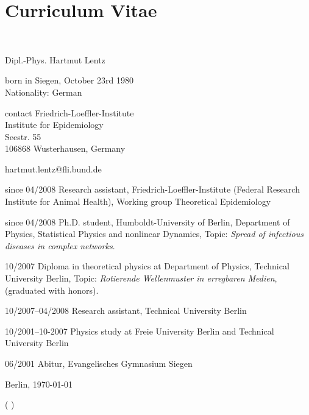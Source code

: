 \chapter*{Curriculum Vitae}

\begin{cv}{~}
  
\begin{cvlist}{\color{Steel}{Personal information}}
  \item Dipl.-Phys. Hartmut Lentz
    \item born in Siegen, October 23rd 1980\\
	Nationality: German
    \item[contact] Friedrich-Loeffler-Institute\\
    Institute for Epidemiology\\
    Seestr. 55\\
    106868 Wusterhausen, Germany
   \item hartmut.lentz@fli.bund.de	

\end{cvlist}

  \begin{cvlist}{\color{Steel}{Education and job history}}
  \item[since 04/2008] Research assistant, Friedrich-Loeffler-Institute (Federal Research Institute for Animal Health), Working group Theoretical Epidemiology
   \item[since 04/2008] Ph.D. student, Humboldt-University of Berlin, Department of
Physics, Statistical Physics and nonlinear Dynamics, Topic: \emph{Spread of infectious diseases in complex networks}.
  \item[10/2007] Diploma in theoretical physics at Department of Physics, Technical University Berlin, Topic: \emph{Rotierende Wellenmuster in erregbaren Medien}, (graduated with honors).
  \item[10/2007--04/2008] Research assistant, Technical University Berlin
  \item[10/2001--10-2007] Physics study at Freie University Berlin and Technical University Berlin
  \item[06/2001] Abitur, Evangelisches Gymnasium Siegen
  \end{cvlist}

  \date{}
\end{cv}

\noindent Berlin, \today   %

\par\hspace{8cm}  ( \authorfirstname \authorsurname)
